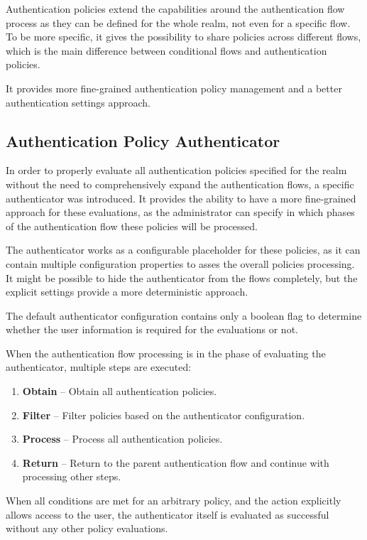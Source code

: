Authentication policies extend the capabilities around the authentication flow process as they can be defined for the whole realm, not even for a specific flow.
To be more specific, it gives the possibility to share policies across different flows, which is the main difference between conditional flows and authentication policies.

It provides more fine-grained authentication policy management and a better authentication settings approach.

\newpage

\subsection{Authentication Policy Authenticator}
In order to properly evaluate all authentication policies specified for the realm without the need to comprehensively expand the authentication flows, a specific authenticator was introduced.
It provides the ability to have a more fine-grained approach for these evaluations, as the administrator can specify in which phases of the authentication flow these policies will be processed.

The authenticator works as a configurable placeholder for these policies, as it can contain multiple configuration properties to asses the overall policies processing.
It might be possible to hide the authenticator from the flows completely, but the explicit settings provide a more deterministic approach.

The default authenticator configuration contains only a boolean flag to determine whether the user information is required for the evaluations or not.

When the authentication flow processing is in the phase of evaluating the authenticator, multiple steps are executed:

\begin{enumerate}
    \item \textbf{Obtain} -- Obtain all authentication policies.
    \item \textbf{Filter} -- Filter policies based on the authenticator configuration.
    \item \textbf{Process} -- Process all authentication policies.
    \item \textbf{Return} -- Return to the parent authentication flow and continue with processing other steps.
\end{enumerate}

When all conditions are met for an arbitrary policy, and the action explicitly allows access to the user, the authenticator itself is evaluated as successful without any other policy evaluations.

